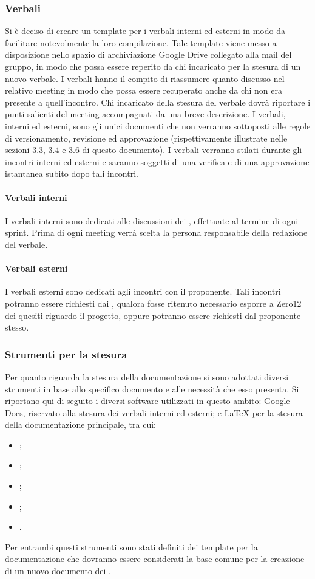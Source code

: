 \subsubsection{Verbali}
Si è deciso di creare un template per i verbali interni ed esterni in modo da facilitare notevolmente la loro compilazione. Tale template viene messo a disposizione nello spazio di archiviazione  Google Drive\glo{} collegato alla mail del gruppo, in modo che possa essere reperito da chi incaricato per la stesura di un nuovo verbale.
I verbali hanno il compito di riassumere quanto discusso nel relativo meeting in modo che possa essere recuperato anche da chi non era presente a quell'incontro.
Chi incaricato della stesura del verbale dovrà riportare i punti salienti del meeting accompagnati da una breve descrizione.
I verbali, interni ed esterni, sono gli unici documenti che non verranno sottoposti alle regole di versionamento, revisione ed approvazione (rispettivamente illustrate nelle sezioni 3.3, 3.4 e
3.6 di questo documento). I verbali verranno stilati durante gli incontri interni ed esterni e saranno soggetti di una verifica e di una approvazione istantanea subito dopo tali incontri.

\paragraph{Verbali interni}
I verbali interni sono dedicati alle discussioni dei \groupName{}, effettuate al termine di ogni sprint. Prima di ogni meeting verrà scelta la persona responsabile della redazione del verbale. 

\paragraph{Verbali esterni}
I verbali esterni sono dedicati agli incontri con il proponente.
Tali incontri potranno essere richiesti dai \groupName{}, qualora fosse ritenuto necessario esporre a Zero12 dei quesiti riguardo il progetto, oppure potranno essere richiesti dal proponente stesso.

\subsubsection{Strumenti per la stesura}
Per quanto riguarda la stesura della documentazione si sono adottati diversi strumenti in base allo specifico documento e alle necessità che esso presenta. 
Si riportano qui di seguito i diversi software utilizzati in
questo ambito: Google Docs\glo{}, riservato alla stesura dei verbali interni ed esterni; e LaTeX\glo{} per la
stesura della documentazione principale, tra cui: 
\begin{itemize}
\item \docNameNdP{};
\item \docNamePdP{};
\item \docNameAdR{};
\item \docNamePdQ{};
\item \docNameGlo{}.
\end{itemize}
Per entrambi questi strumenti sono stati definiti dei
template per la documentazione che dovranno essere considerati la base comune per la creazione di un nuovo documento dei \groupName{}.

